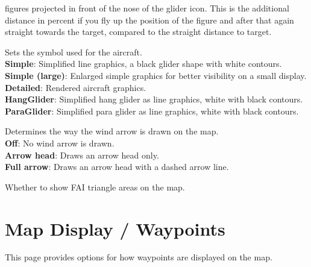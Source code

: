 \begin{description}
  figures projected in front of the nose of the glider icon.  This is the
  additional distance in percent if you fly up the position of the figure and
  after that again straight towards the target, compared to the straight distance
  to target.
\item[Aircraft symbol*]  Sets the symbol used for the aircraft. \\
  {\bf Simple}: Simplified line graphics, a black glider shape with white contours. \\
  {\bf Simple (large)}: Enlarged simple graphics for better visibility on a small display. \\
  {\bf Detailed}: Rendered aircraft graphics. \\
  {\bf HangGlider}: Simplified hang glider as line graphics, white with black contours. \\
  {\bf ParaGlider}: Simplified para glider as line graphics, white with black contours.
\item[Wind arrow*]  Determines the way the wind arrow is drawn on the map. \\
  {\bf Off}: No wind arrow is drawn. \\
  {\bf Arrow head}: Draws an arrow head only. \\
  {\bf Full arrow}: Draws an arrow head with a dashed arrow line.
\item[FAI triangle areas] Whether to show FAI triangle areas on the map.
  
\end{description}


\section{Map Display / Waypoints}\label{sec:waypoint-display}

This page provides options for how waypoints are displayed on the map.

